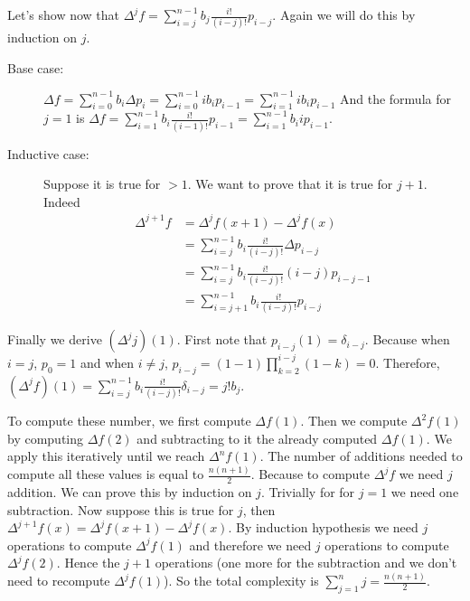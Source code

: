 \documentclass[12pt,a4paper]{article}
\begin{document}
Let's show now that $\Delta^j f = \sum_{i = j}^{n - 1}b_j \frac{i!}{(i-j)!}p_{i-j}$.
Again we will do this by induction on $j$.
\begin{description}
    \item[Base case:] $\Delta f = \sum_{i = 0}^{n-1} b_i \Delta p_i = \sum_{i=0}^{n-1}i b_i p_{i-1} = \sum_{i=1}^{n-1}i b_i p_{i-1}$
        And the formula for $j=1$ is $\Delta f = \sum_{i = 1}^{n-1}b_i \frac{i!}{(i-1)!}p_{i-1} = \sum_{i=1}^{n-1}b_i i p_{i-1}$.
    \item[Inductive case:] Suppose it is true for $> 1$. We want to prove that it is true for $j+1$. Indeed
        \[
            \begin{split}
                \Delta^{j+1} f &= \Delta^j f(x+1) - \Delta^j f(x) \\
                               &= \sum_{i = j}^{n-1} b_i \frac{i!}{(i-j)!}\Delta p_{i-j}\\
                               &= \sum_{i = j}^{n-1}  b_i \frac{i!}{(i-j)!}(i-j)p_{i-j-1}\\
                               &= \sum_{i = j+1}^{n-1} b_i \frac{i!}{(i-j)!}p_{i-j}
            \end{split}
        \]
\end{description}

Finally we derive $(\Delta^j j)(1)$. First note that $p_{i-j}(1) = \delta_{i-j}$. Because when $i=j$, $p_0 = 1$ and when
$i \neq j$, $p_{i-j} = (1 - 1) \prod_{k = 2}^{i-j}(1 - k) = 0$.
Therefore, $(\Delta^j f)(1) = \sum_{i=j}^{n-1} b_i \frac{i!}{(i-j)!}\delta_{i-j} = j!b_j$.

To compute these number, we first compute $\Delta f(1)$. Then we compute $\Delta^2 f(1)$ by computing $\Delta f(2)$ and subtracting to it the already computed
$\Delta f(1)$. We apply this iteratively until we reach $\Delta^n f(1)$.
The number of additions needed to compute all these values is equal to $\frac{n(n+1)}{2}$.
Because to compute $\Delta^jf$ we need $j$ addition. We can prove this by induction on $j$.
Trivially for for $j=1$ we need one subtraction. Now suppose this is true for $j$, then $\Delta^{j+1}f(x) = \Delta^jf(x+1) - \Delta^jf(x)$.
By induction hypothesis we need $j$ operations to compute $\Delta^j f(1)$ and therefore we need $j$ operations to compute $\Delta^jf(2)$.
Hence the $j+1$ operations (one more for the subtraction and we don't need to recompute $\Delta^j f(1)$). So the total complexity is $\sum_{j=1}^n j = \frac{n(n+1)}{2}$.
\end{document}
